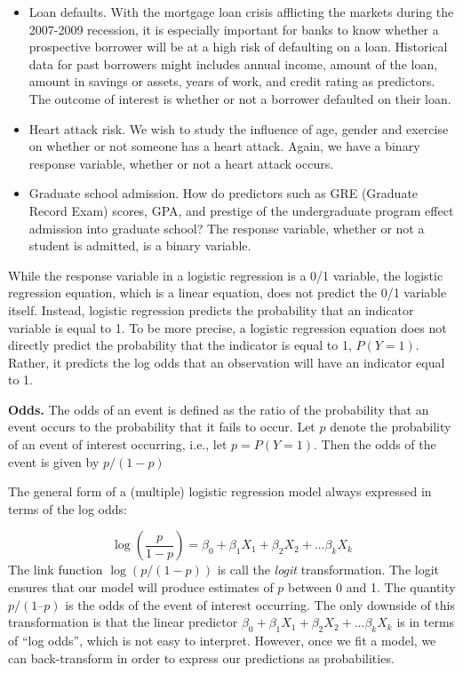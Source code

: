 \documentclass[
]{book}
\providecommand{\tightlist}{%
  \setlength{\itemsep}{0pt}\setlength{\parskip}{0pt}}
\begin{document}
\begin{itemize}
\tightlist
\item
  Loan defaults. With the mortgage loan crisis afflicting the markets during the 2007-2009 recession, it is especially important for banks to know whether a prospective borrower will be at a high risk of defaulting on a loan. Historical data for past borrowers might includes annual income, amount of the loan, amount in savings or assets, years of work, and credit rating as predictors. The outcome of interest is whether or not a borrower defaulted on their loan.
\item
  Heart attack risk. We wish to study the influence of age, gender and exercise on whether or not someone has a heart attack. Again, we have a binary response variable, whether or not a heart attack occurs.
\item
  Graduate school admission. How do predictors such as GRE (Graduate Record Exam) scores, GPA, and prestige of the undergraduate program effect admission into graduate school? The response variable, whether or not a student is admitted, is a binary variable.
\end{itemize}

While the response variable in a logistic regression is a 0/1 variable, the logistic regression equation, which is a linear equation, does not predict the 0/1 variable itself. Instead, logistic regression predicts the probability that an indicator variable is equal to 1. To be more precise, a logistic regression equation does not directly predict the probability that the indicator is equal to 1, \(P(Y = 1)\). Rather, it predicts the log odds that an observation will have an indicator equal to 1.

\textbf{Odds.} The odds of an event is defined as the ratio of the probability that an event occurs to the probability that it fails to occur. Let \(p\) denote the probability of an event of interest occurring, i.e., let \(p = P(Y = 1)\). Then the odds of the event is given by \(p/(1-p)\)

The general form of a (multiple) logistic regression model always expressed in terms of the log odds:

\[\log\left(\frac{p}{1-p}\right) = \beta_0 + \beta_1 X_1 + \beta_2 X_2 + \ldots \beta_k X_k\]
The link function \(\log\left(p/(1-p)\right)\) is call the \emph{logit} transformation. The logit ensures that our model will produce estimates of \(p\) between 0 and 1. The quantity \(p/(1 – p)\) is the odds of the event of interest occurring. The only downside of this transformation is that the linear predictor \(\beta_0 + \beta_1 X_1 + \beta_2 X_2 + \ldots \beta_k X_k\) is in terms of ``log odds'', which is not easy to interpret. However, once we fit a model, we can back-transform in order to express our predictions as probabilities.
\end{document}
